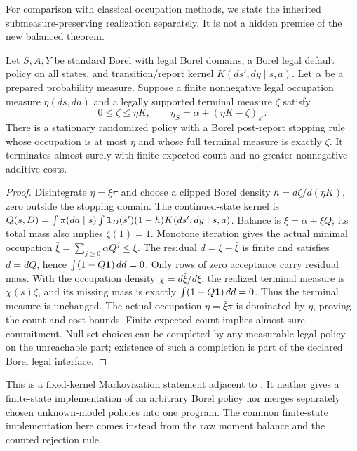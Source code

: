 For comparison with classical occupation methods, we state the inherited submeasure-preserving realization separately. It is not a hidden premise of the new balanced theorem.

\begin{proposition}\label{prop:flow}
Let $S,A,Y$ be standard Borel with legal Borel domains, a Borel legal default policy on all states, and transition/report kernel $K(ds',dy\mid s,a)$. Let $\alpha$ be a prepared probability measure. Suppose a finite nonnegative legal occupation measure $\eta(ds,da)$ and a legally supported terminal measure $\zeta$ satisfy
\[
 0\le\zeta\le\eta K,\qquad
 \eta_S=\alpha+(\eta K-\zeta)_{s'}.
\]
There is a stationary randomized policy with a Borel post-report stopping rule whose occupation is at most $\eta$ and whose full terminal measure is exactly $\zeta$. It terminates almost surely with finite expected count and no greater nonnegative additive costs.
\end{proposition}
\begin{proof}
Disintegrate $\eta=\xi\pi$ and choose a clipped Borel density $h=d\zeta/d(\eta K)$, zero outside the stopping domain. The continued-state kernel is
$Q(s,D)=\int\pi(da\mid s)\int\mathbf1_D(s')(1-h)K(ds',dy\mid s,a)$.
Balance is $\xi=\alpha+\xi Q$; its total mass also implies $\zeta(1)=1$. Monotone iteration gives the actual minimal occupation $\bar\xi=\sum_{j\ge0}\alpha Q^j\le\xi$. The residual $d=\xi-\bar\xi$ is finite and satisfies $d=dQ$, hence $\int(1-Q\mathbf1)\,dd=0$. Only rows of zero acceptance carry residual mass. With the occupation density $\chi=d\bar\xi/d\xi$, the realized terminal measure is $\chi(s)\zeta$, and its missing mass is exactly $\int(1-Q\mathbf1)\,dd=0$. Thus the terminal measure is unchanged. The actual occupation $\bar\eta=\bar\xi\pi$ is dominated by $\eta$, proving the count and cost bounds. Finite expected count implies almost-sure commitment. Null-set choices can be completed by any measurable legal policy on the unreachable part; existence of such a completion is part of the declared Borel legal interface.
\end{proof}

This is a fixed-kernel Markovization statement adjacent to \cite{PZExtreme,PZContinuity,DPAbsorb}. It neither gives a finite-state implementation of an arbitrary Borel policy nor merges separately chosen unknown-model policies into one program. The common finite-state implementation here comes instead from the raw moment balance and the counted rejection rule.
